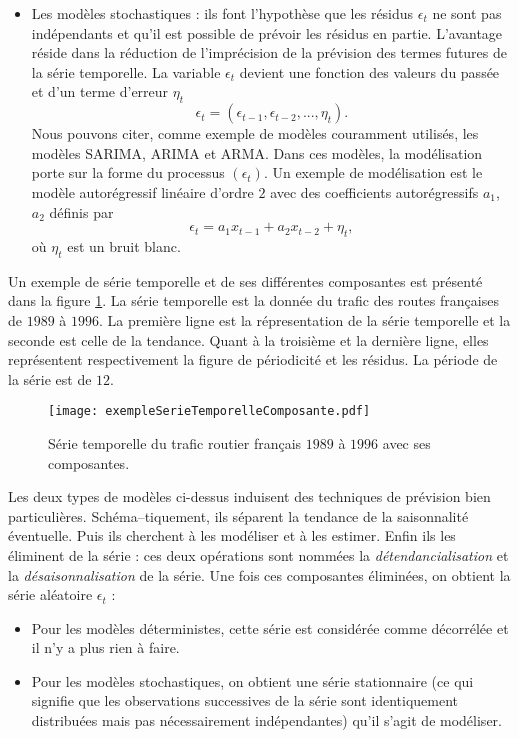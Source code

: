 \begin{itemize}
	\item Les mod\`eles stochastiques : ils font l'hypoth\`ese que les r\'esidus $\epsilon_t$ ne sont pas ind\'ependants et qu'il est possible de pr\'evoir les r\'esidus en partie. L'avantage r\'eside dans la r\'eduction de l'impr\'ecision de la pr\'evision des termes futures de la s\'erie temporelle.  La variable $\epsilon_t$ devient une fonction des valeurs du pass\'ee et d'un terme d'erreur $\eta_t$ $$\epsilon_t = (\epsilon_{t-1}, \epsilon_{t-2}, ... , \eta_{t}).$$
	Nous pouvons citer, comme exemple de mod\`eles couramment utilis\'es, les mod\`eles SARIMA, ARIMA et ARMA. Dans ces mod\`eles, la mod\'elisation porte sur la forme du processus $(\epsilon_t)$. Un exemple de mod\'elisation est le mod\`ele autor\'egressif lin\'eaire d'ordre $2$ avec des coefficients autor\'egressifs $a_1$, $a_2$ d\'efinis par 
	$$\epsilon_t = a_1 x_{t-1} + a_2 x_{t-2} + \eta_t,$$ o\`u $\eta_t$ est un bruit blanc.
\end{itemize}
Un exemple de s\'erie temporelle et de ses diff\'erentes composantes est pr\'esent\'e dans la figure \ref{exempleSerieTemporelleComposante}. La s\'erie temporelle est la donn\'ee du trafic des routes fran\c caises de $1989$ \`a $1996$.
La premi\`ere ligne est la r\'epresentation de la s\'erie temporelle et la seconde est celle de la tendance. Quant \`a la troisi\`eme  et la derni\`ere ligne, elles repr\'esentent respectivement la figure de p\'eriodicit\'e et les r\'esidus. La p\'eriode de la s\'erie est de $12$.
\begin{figure}[htb!] 
\centering
\texttt{[image: exempleSerieTemporelleComposante.pdf]}
\caption{ S\'erie temporelle du trafic routier fran\c cais $1989$ \`a $1996$ avec ses composantes.}
\label{exempleSerieTemporelleComposante}
\end{figure}

Les deux types de mod\`eles ci-dessus induisent des techniques de pr\'evision bien particuli\`eres. 
Sch\'ema--tiquement, ils s\'eparent la tendance de la saisonnalit\'e \'eventuelle. Puis ils cherchent \`a les mod\'eliser et \`a les estimer.  Enfin ils les \'eliminent de la s\'erie : ces deux op\'erations sont nomm\'ees
la {\em d\'etendancialisation} et la {\em d\'esaisonnalisation} de la s\'erie. Une fois ces composantes \'elimin\'ees, on obtient la s\'erie al\'eatoire $\epsilon_t$ :
\begin{itemize}
	\item Pour les mod\`eles d\'eterministes, cette s\'erie est consid\'er\'ee comme d\'ecorr\'el\'ee et il n'y a plus rien \`a faire.
	\item Pour les mod\`eles stochastiques, on obtient une s\'erie stationnaire (ce qui signifie que les observations successives de la s\'erie sont identiquement distribu\'ees mais pas n\'ecessairement ind\'ependantes) qu'il s'agit de mod\'eliser.
\end{itemize}

